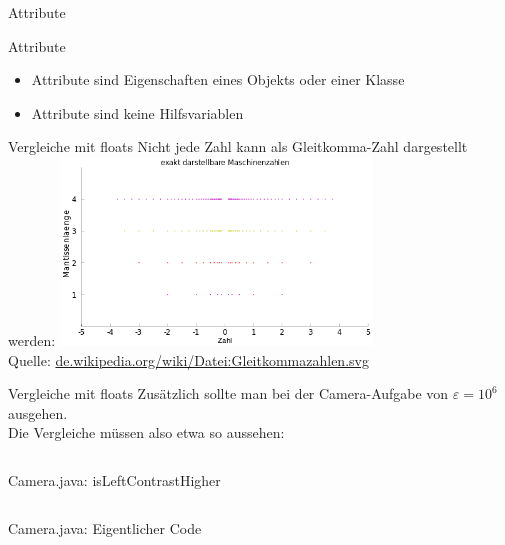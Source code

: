 \documentclass[usepdftitle=false,hyperref={pdfpagelabels=false}]{beamer}
\begin{document}
\begin{frame}{Attribute}
  \begin{alertblock}{Attribute}
    \begin{itemize}
      \item Attribute sind Eigenschaften eines Objekts oder einer Klasse
      \item Attribute sind keine Hilfsvariablen
    \end{itemize}
  \end{alertblock}
\end{frame}

\begin{frame}{Vergleiche mit floats}
    Nicht jede Zahl kann als Gleitkomma-Zahl dargestellt werden:
    \includegraphics[height=50mm]{Gleitkommazahlen.png}\\
    \tiny{Quelle: \href{http://de.wikipedia.org/wiki/Datei:Gleitkommazahlen.svg}{de.wikipedia.org/wiki/Datei:Gleitkommazahlen.svg}}\\


\end{frame}

\begin{frame}{Vergleiche mit floats}
    Zusätzlich sollte man bei der Camera-Aufgabe von $\varepsilon = 10^6$ ausgehen.\\
    Die Vergleiche müssen also etwa so aussehen:
    \inputminted[linenos=false, numbersep=5pt, tabsize=4, fontsize=\small, firstnumber=24, firstline=24, lastline=33]{java}{Camera.java}
\end{frame}

\begin{frame}{Camera.java: isLeftContrastHigher}
    \inputminted[linenos=true, numbersep=5pt, tabsize=4, fontsize=\tiny, firstnumber=35, firstline=35, lastline=55]{java}{Camera.java}
\end{frame}

\begin{frame}{Camera.java: Eigentlicher Code}
    \inputminted[linenos=true, numbersep=5pt, tabsize=4, fontsize=\tiny, firstnumber=57, firstline=57, lastline=87]{java}{Camera.java}
\end{frame}
\end{document}
